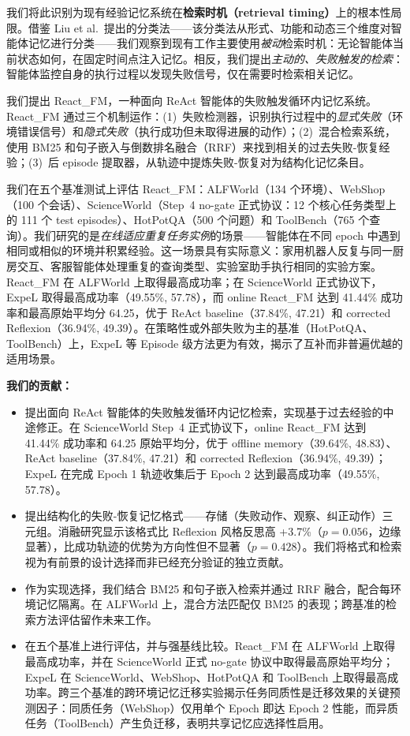 \documentclass[11pt,a4paper]{article}
\newcommand{\method}{React\_FM}
\begin{document}
我们将此识别为现有经验记忆系统在\textbf{检索时机（retrieval timing）}上的根本性局限。借鉴 Liu et al.~\cite{liu2025memory}提出的分类法——该分类法从形式、功能和动态三个维度对智能体记忆进行分类——我们观察到现有工作主要使用\emph{被动}检索时机：无论智能体当前状态如何，在固定时间点注入记忆。相反，我们提出\emph{主动的、失败触发的检索}：智能体监控自身的执行过程以发现失败信号，仅在需要时检索相关记忆。

我们提出 \method{}，一种面向 ReAct 智能体的失败触发循环内记忆系统。\method{} 通过三个机制运作：(1)~失败检测器，识别执行过程中的\emph{显式失败}（环境错误信号）和\emph{隐式失败}（执行成功但未取得进展的动作）；(2)~混合检索系统，使用 BM25 和句子嵌入与倒数排名融合（RRF）来找到相关的过去失败-恢复经验；(3)~后 episode 提取器，从轨迹中提炼失败-恢复对为结构化记忆条目。

我们在五个基准测试上评估 \method{}：ALFWorld（134 个环境）、WebShop（100 个会话）、ScienceWorld（Step~4 no-gate 正式协议：12 个核心任务类型上的 111 个 test episodes）、HotPotQA（500 个问题）和 ToolBench（765 个查询）。我们研究的是\emph{在线适应重复任务实例}的场景——智能体在不同 epoch 中遇到相同或相似的环境并积累经验。这一场景具有实际意义：家用机器人反复与同一厨房交互、客服智能体处理重复的查询类型、实验室助手执行相同的实验方案。\method{} 在 ALFWorld 上取得最高成功率；在 ScienceWorld 正式协议下，ExpeL 取得最高成功率（49.55\%, 57.78），而 online \method{} 达到 41.44\% 成功率和最高原始平均分 64.25，优于 ReAct baseline（37.84\%, 47.21）和 corrected Reflexion（36.94\%, 49.39）。在策略性或外部失败为主的基准（HotPotQA、ToolBench）上，ExpeL 等 Episode 级方法更为有效，揭示了互补而非普遍优越的适用场景。

\textbf{我们的贡献：}
\begin{itemize}
    \item 提出面向 ReAct 智能体的失败触发循环内记忆检索，实现基于过去经验的中途修正。在 ScienceWorld Step~4 正式协议下，online \method{} 达到 41.44\% 成功率和 64.25 原始平均分，优于 offline memory（39.64\%, 48.83）、ReAct baseline（37.84\%, 47.21）和 corrected Reflexion（36.94\%, 49.39）；ExpeL 在完成 Epoch 1 轨迹收集后于 Epoch 2 达到最高成功率（49.55\%, 57.78）。
    \item 提出结构化的失败-恢复记忆格式——存储（失败动作、观察、纠正动作）三元组。消融研究显示该格式比 Reflexion 风格反思高 +3.7\%（$p{=}0.056$，边缘显著），比成功轨迹的优势为方向性但不显著（$p{=}0.428$）。我们将格式和检索视为有前景的设计选择而非已经充分验证的独立贡献。
    \item 作为实现选择，我们结合 BM25 和句子嵌入检索并通过 RRF 融合，配合每环境记忆隔离。在 ALFWorld 上，混合方法匹配仅 BM25 的表现；跨基准的检索方法评估留作未来工作。
    \item 在五个基准上进行评估，并与强基线比较。\method{} 在 ALFWorld 上取得最高成功率，并在 ScienceWorld 正式 no-gate 协议中取得最高原始平均分；ExpeL 在 ScienceWorld、WebShop、HotPotQA 和 ToolBench 上取得最高成功率。跨三个基准的跨环境记忆迁移实验揭示任务同质性是迁移效果的关键预测因子：同质任务（WebShop）仅用单个 Epoch 即达 Epoch 2 性能，而异质任务（ToolBench）产生负迁移，表明共享记忆应选择性启用。
\end{itemize}
\end{document}
